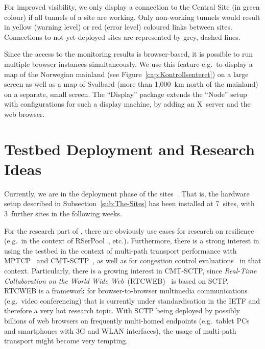 For improved visibility, we only display a connection to the Central Site (in green colour) if all tunnels of a site are working. Only non-working tunnels would result in yellow (warning level) or red (error level) coloured links between sites. Connections to not-yet-deployed sites are represented by grey, dashed lines.

Since the access to the monitoring results is browser-based, it is possible to run multiple browser instances simultaneously. We use this feature e.g.\ to display a map of the Norwegian mainland (see Figure~\ref{cap:Kontrollsenteret}) on a large screen as well as a map of Svalbard (more than 1,000~km north of the mainland) on a separate, small screen. The ``Display'' package extends the ``Node'' setup with configurations for such a display machine, by adding an X~server and the  web browser.





\section{Testbed Deployment and Research Ideas}

Currently, we are in the deployment phase of the sites~\cite{Karlstad2012}. That is, the hardware setup described in Subsection~\ref{sub:The-Sites} has been installed at 7~sites, with 3~further sites in the following weeks.

For the research part of , there are obviously use cases for research on resilience (e.g.\ in the context of RSerPool~\cite{IJIIDS2010,Dre2006,rfc-rserpool-overview}, etc.). Furthermore, there is a strong interest in using the testbed in the context of multi-path transport performance with MPTCP~\cite{RBP+11} and CMT-SCTP~\cite{PAMS2012}, as well as for congestion control evaluations~\cite{Globecom2013,ICC2012,YWY08a} in that context. Particularly, there is a growing interest in CMT-SCTP, since \emph{Real-Time Collaboration on the World Wide Web}~(RTCWEB)~\cite{draft-ietf-rtcweb-overview} is based on SCTP. RTCWEB is a framework for browser-to-browser multimedia communications (e.g.\ video conferencing) that is currently under standardisation in the IETF and therefore a very hot research topic. With SCTP being deployed by possibly billions of web browsers on frequently multi-homed endpoints (e.g.\ tablet PCs and smartphones with 3G and WLAN interfaces), the usage of multi-path transport might become very tempting. 



